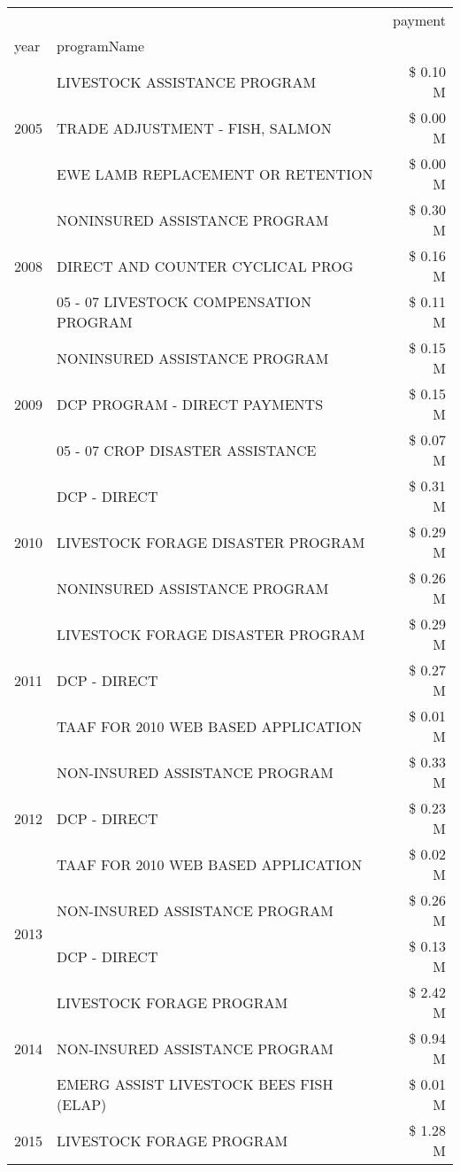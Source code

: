 \begin{tabular}{llr}
\toprule
 &  & payment \\
year & programName &  \\
\midrule
\multirow[t]{3}{*}{2005} & LIVESTOCK ASSISTANCE PROGRAM & \$ 0.10 M \\
 & TRADE ADJUSTMENT - FISH, SALMON & \$ 0.00 M \\
 & EWE LAMB REPLACEMENT OR RETENTION & \$ 0.00 M \\
\cline{1-3}
\multirow[t]{3}{*}{2008} & NONINSURED ASSISTANCE PROGRAM & \$ 0.30 M \\
 & DIRECT AND COUNTER CYCLICAL PROG & \$ 0.16 M \\
 & 05 - 07 LIVESTOCK COMPENSATION PROGRAM & \$ 0.11 M \\
\cline{1-3}
\multirow[t]{3}{*}{2009} & NONINSURED ASSISTANCE PROGRAM & \$ 0.15 M \\
 & DCP PROGRAM - DIRECT PAYMENTS & \$ 0.15 M \\
 & 05 - 07 CROP DISASTER ASSISTANCE & \$ 0.07 M \\
\cline{1-3}
\multirow[t]{3}{*}{2010} & DCP - DIRECT & \$ 0.31 M \\
 & LIVESTOCK FORAGE DISASTER PROGRAM & \$ 0.29 M \\
 & NONINSURED ASSISTANCE PROGRAM & \$ 0.26 M \\
\cline{1-3}
\multirow[t]{3}{*}{2011} & LIVESTOCK FORAGE DISASTER PROGRAM & \$ 0.29 M \\
 & DCP - DIRECT & \$ 0.27 M \\
 & TAAF FOR 2010 WEB BASED APPLICATION & \$ 0.01 M \\
\cline{1-3}
\multirow[t]{3}{*}{2012} & NON-INSURED ASSISTANCE PROGRAM & \$ 0.33 M \\
 & DCP - DIRECT & \$ 0.23 M \\
 & TAAF FOR 2010 WEB BASED APPLICATION & \$ 0.02 M \\
\cline{1-3}
\multirow[t]{2}{*}{2013} & NON-INSURED ASSISTANCE PROGRAM & \$ 0.26 M \\
 & DCP - DIRECT & \$ 0.13 M \\
\cline{1-3}
\multirow[t]{3}{*}{2014} & LIVESTOCK FORAGE PROGRAM & \$ 2.42 M \\
 & NON-INSURED ASSISTANCE PROGRAM & \$ 0.94 M \\
 & EMERG ASSIST LIVESTOCK BEES FISH (ELAP) & \$ 0.01 M \\
\cline{1-3}
\multirow[t]{3}{*}{2015} & LIVESTOCK FORAGE PROGRAM & \$ 1.28 M \\

\end{tabular}
